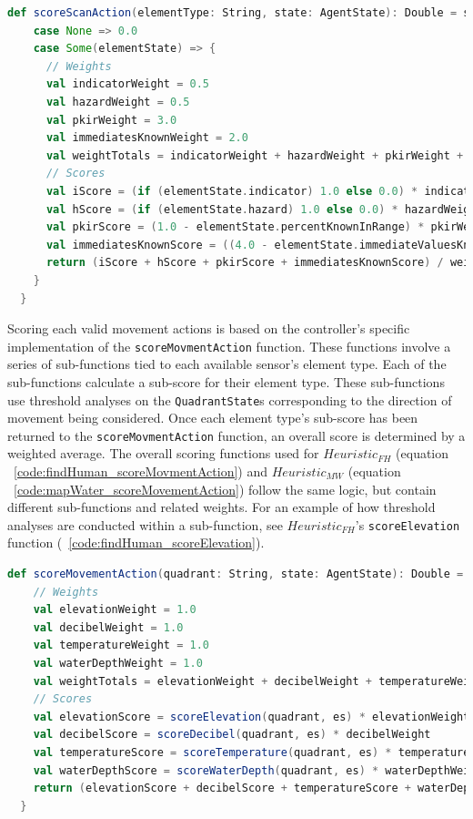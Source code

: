 \begin{lstlisting}[language=Scala, label=code:score_scan_action]
  def scoreScanAction(elementType: String, state: AgentState): Double = state.getElementState(elementType) match {
    case None => 0.0
    case Some(elementState) => {
      // Weights
      val indicatorWeight = 0.5
      val hazardWeight = 0.5
      val pkirWeight = 3.0
      val immediatesKnownWeight = 2.0
      val weightTotals = indicatorWeight + hazardWeight + pkirWeight + immediatesKnownWeight
      // Scores
      val iScore = (if (elementState.indicator) 1.0 else 0.0) * indicatorWeight
      val hScore = (if (elementState.hazard) 1.0 else 0.0) * hazardWeight
      val pkirScore = (1.0 - elementState.percentKnownInRange) * pkirWeight
      val immediatesKnownScore = ((4.0 - elementState.immediateValuesKnown.toDouble) / 4.0) * immediatesKnownWeight
      return (iScore + hScore + pkirScore + immediatesKnownScore) / weightTotals
    }
  }
\end{lstlisting}

Scoring each valid movement actions is based on the controller's specific implementation of the \texttt{scoreMovmentAction} function.
These functions involve a series of sub-functions tied to each available sensor's element type.
Each of the sub-functions calculate a sub-score for their element type.
These sub-functions use threshold analyses on the \texttt{QuadrantState}s corresponding to the direction of movement being considered.
Once each element type's sub-score has been returned to the \texttt{scoreMovmentAction} function, an overall score is determined by a weighted average.
The overall scoring functions used for $Heuristic_{FH}$ (equation ~\ref{code:findHuman_scoreMovmentAction}) and $Heuristic_{MW}$ (equation ~\ref{code:mapWater_scoreMovementAction}) follow the same logic, but contain different sub-functions and related weights.
For an example of how threshold analyses are conducted within a sub-function, see $Heuristic_{FH}$'s \texttt{scoreElevation} function (~\ref{code:findHuman_scoreElevation}).


\begin{lstlisting}[language=Scala, label=code:findHuman_scoreMovmentAction]
  def scoreMovementAction(quadrant: String, state: AgentState): Double = {
    // Weights
    val elevationWeight = 1.0
    val decibelWeight = 1.0
    val temperatureWeight = 1.0
    val waterDepthWeight = 1.0
    val weightTotals = elevationWeight + decibelWeight + temperatureWeight + waterDepthWeight
    // Scores
    val elevationScore = scoreElevation(quadrant, es) * elevationWeight
    val decibelScore = scoreDecibel(quadrant, es) * decibelWeight
    val temperatureScore = scoreTemperature(quadrant, es) * temperatureWeight
    val waterDepthScore = scoreWaterDepth(quadrant, es) * waterDepthWeight
    return (elevationScore + decibelScore + temperatureScore + waterDepthScore) / weightTotals
  }
\end{lstlisting}

